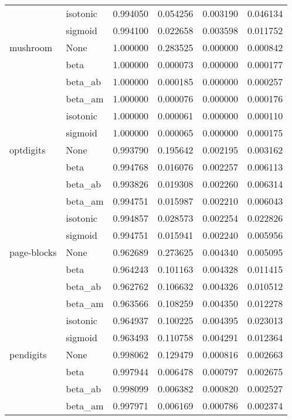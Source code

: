 \begin{tabular}{llrrrr}
        & isotonic &  0.994050 &  0.054256 &  0.003190 &  0.046134 \\
        & sigmoid &  0.994100 &  0.022658 &  0.003598 &  0.011752 \\
mushroom & None &  1.000000 &  0.283525 &  0.000000 &  0.000842 \\
        & beta &  1.000000 &  0.000073 &  0.000000 &  0.000177 \\
        & beta\_ab &  1.000000 &  0.000185 &  0.000000 &  0.000257 \\
        & beta\_am &  1.000000 &  0.000076 &  0.000000 &  0.000176 \\
        & isotonic &  1.000000 &  0.000061 &  0.000000 &  0.000110 \\
        & sigmoid &  1.000000 &  0.000065 &  0.000000 &  0.000175 \\
optdigits & None &  0.993790 &  0.195642 &  0.002195 &  0.003162 \\
        & beta &  0.994768 &  0.016076 &  0.002257 &  0.006113 \\
        & beta\_ab &  0.993826 &  0.019308 &  0.002260 &  0.006314 \\
        & beta\_am &  0.994751 &  0.015987 &  0.002210 &  0.006043 \\
        & isotonic &  0.994857 &  0.028573 &  0.002254 &  0.022826 \\
        & sigmoid &  0.994751 &  0.015941 &  0.002240 &  0.005956 \\
page-blocks & None &  0.962689 &  0.273625 &  0.004340 &  0.005095 \\
        & beta &  0.964243 &  0.101163 &  0.004328 &  0.011415 \\
        & beta\_ab &  0.962762 &  0.106632 &  0.004326 &  0.010512 \\
        & beta\_am &  0.963566 &  0.108259 &  0.004350 &  0.012278 \\
        & isotonic &  0.964937 &  0.100225 &  0.004395 &  0.023013 \\
        & sigmoid &  0.963493 &  0.110758 &  0.004291 &  0.012364 \\
pendigits & None &  0.998062 &  0.129479 &  0.000816 &  0.002663 \\
        & beta &  0.997944 &  0.006478 &  0.000797 &  0.002675 \\
        & beta\_ab &  0.998099 &  0.006382 &  0.000820 &  0.002527 \\
        & beta\_am &  0.997971 &  0.006169 &  0.000786 &  0.002374 \\

\end{tabular}
